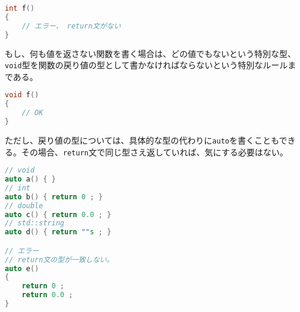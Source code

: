 \begin{lstlisting}[language={C++}]
int f()
{
    // エラー、 return文がない
}
\end{lstlisting}

もし、何も値を返さない関数を書く場合は、どの値でもないという特別な型、\texttt{void}型を関数の戻り値の型として書かなければならないという特別なルールまである。

\begin{lstlisting}[language={C++}]
void f()
{
    // OK
}
\end{lstlisting}

ただし、戻り値の型については、具体的な型の代わりに\texttt{auto}を書くこともできる。その場合、\texttt{return}文で同じ型さえ返していれば、気にする必要はない。

\begin{lstlisting}[language={C++}]
// void
auto a() { }
// int
auto b() { return 0 ; }
// double
auto c() { return 0.0 ; }
// std::string
auto d() { return ""s ; }

// エラー
// return文の型が一致しない。
auto e()
{
    return 0 ;
    return 0.0 ;
}
\end{lstlisting}

